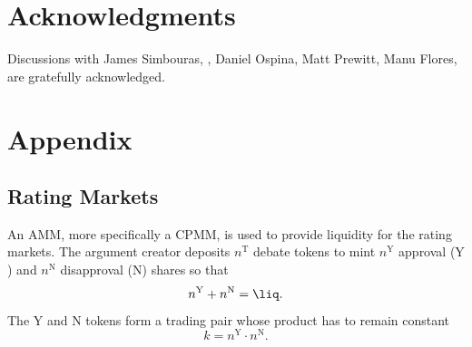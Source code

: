 \documentclass[%
aip,
amsmath,amssymb,
reprint,%
unsortedaddress,
nofootinbib
]{revtex4-2}
\newcommand{\T}{\text{T}}
\newcommand{\Y}{\text{Y}}
\newcommand{\N}{\text{N}}
\begin{document}
\section*{Acknowledgments}


Discussions
with 
James Simbouras,
,
Daniel Ospina,
Matt Prewitt, 
Manu Flores,
are gratefully acknowledged.


\section*{Appendix}

\subsection*{Rating Markets}\label{sec:RatingMarkets}
An \ac{AMM}, more specifically a \ac{CPMM}, is used to provide liquidity for the rating markets.
The argument creator deposits $n^\T$ debate tokens 
to mint 
$n^\Y$ approval ($\Y$) and 
$n^\N$ disapproval ($\N$) shares
so that
\begin{equation}
	n^\Y+n^\N = \liq.
\end{equation}
The $\Y$ and $\N$ tokens form a trading pair
whose product has to remain constant
\begin{equation}
	k = n^\Y\cdot n^\N.
\end{equation}
\end{document}

